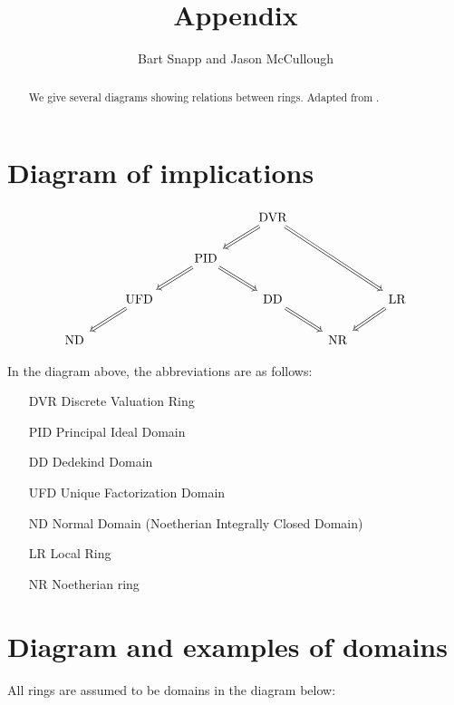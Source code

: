 \documentclass{ximera}
\author{Bart Snapp and Jason McCullough}
\title{Appendix}
\begin{document}
\begin{abstract}
We give several diagrams showing relations between rings.  Adapted
from \cite{sD2008}.
\end{abstract}
\maketitle

\section{Diagram of implications}

\[
\begin{tikzcd}          
              & &         & \text{DVR} \ar[Rightarrow,rrdd]\ar[Rightarrow,ld] &    &                 \\   
& & \text{PID} \ar[Rightarrow,rd]\ar[Rightarrow,ld] &  &                                   & \\
& \text{UFD} \ar[Rightarrow,ld] &   & \text{DD} \ar[Rightarrow,rd] &   & \text{LR} \ar[Rightarrow,ld] \\
\text{ND} & & & & \text{NR} &                            
\end{tikzcd}                 
\]

\noindent In the diagram above, the abbreviations are as follows:

\begin{itemize}
\item[DVR] Discrete Valuation Ring
\item[PID] Principal Ideal Domain
\item[DD] Dedekind Domain
\item[UFD] Unique Factorization Domain
\item[ND] Normal Domain (Noetherian Integrally Closed Domain)
\item[LR] Local Ring
\item[NR] Noetherian ring
\end{itemize}




\section{Diagram and examples of domains}

All rings are assumed to be domains in the diagram below:
\end{document}

